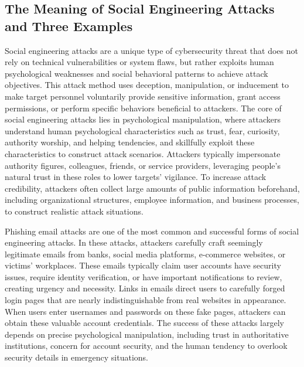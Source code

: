 \documentclass[12pt,a4paper]{article}
\begin{document}
\subsection{The Meaning of Social Engineering Attacks and Three Examples}

Social engineering attacks are a unique type of cybersecurity threat that does not rely on technical vulnerabilities or system flaws, but rather exploits human psychological weaknesses and social behavioral patterns to achieve attack objectives. This attack method uses deception, manipulation, or inducement to make target personnel voluntarily provide sensitive information, grant access permissions, or perform specific behaviors beneficial to attackers. The core of social engineering attacks lies in psychological manipulation, where attackers understand human psychological characteristics such as trust, fear, curiosity, authority worship, and helping tendencies, and skillfully exploit these characteristics to construct attack scenarios. Attackers typically impersonate authority figures, colleagues, friends, or service providers, leveraging people's natural trust in these roles to lower targets' vigilance. To increase attack credibility, attackers often collect large amounts of public information beforehand, including organizational structures, employee information, and business processes, to construct realistic attack situations.

Phishing email attacks are one of the most common and successful forms of social engineering attacks. In these attacks, attackers carefully craft seemingly legitimate emails from banks, social media platforms, e-commerce websites, or victims' workplaces. These emails typically claim user accounts have security issues, require identity verification, or have important notifications to review, creating urgency and necessity. Links in emails direct users to carefully forged login pages that are nearly indistinguishable from real websites in appearance. When users enter usernames and passwords on these fake pages, attackers can obtain these valuable account credentials. The success of these attacks largely depends on precise psychological manipulation, including trust in authoritative institutions, concern for account security, and the human tendency to overlook security details in emergency situations.
\end{document}
